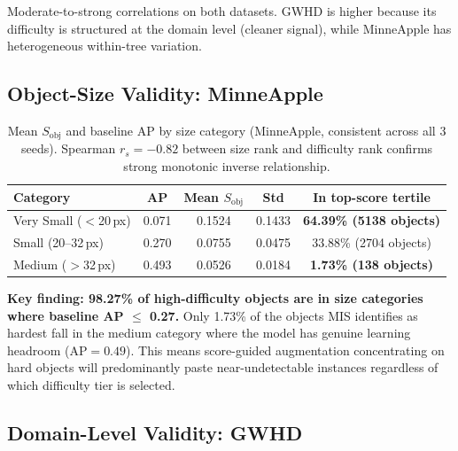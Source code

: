 \documentclass[10pt, a4paper]{article}
\begin{document}
Moderate-to-strong correlations on both datasets.
GWHD is higher because its difficulty is structured at the domain level
(cleaner signal), while MinneApple has heterogeneous within-tree variation.

\subsection{Object-Size Validity: MinneApple}

\begin{table}[H]
\centering
\small
\caption{Mean $S_{\text{obj}}$ and baseline AP by size category (MinneApple,
  consistent across all 3 seeds). Spearman $r_s=-0.82$ between size rank
  and difficulty rank confirms strong monotonic inverse relationship.}
\begin{tabular}{lcccc}
\toprule
\textbf{Category} & \textbf{AP} & \textbf{Mean $S_{\text{obj}}$}
  & \textbf{Std} & \textbf{In top-score tertile} \\
\midrule
Very Small ($<$20\,px) & 0.071 & 0.1524 & 0.1433
  & \textbf{64.39\% (5138 objects)} \\
Small (20--32\,px)     & 0.270 & 0.0755 & 0.0475
  & 33.88\% (2704 objects) \\
Medium ($>$32\,px)     & 0.493 & 0.0526 & 0.0184
  & \textbf{1.73\% (138 objects)} \\
\bottomrule
\end{tabular}
\end{table}

\textbf{Key finding: 98.27\% of high-difficulty objects are in size
categories where baseline AP $\leq$ 0.27.}
Only 1.73\% of the objects MIS identifies as hardest fall in the medium
category where the model has genuine learning headroom (AP$=0.49$).
This means score-guided augmentation concentrating on hard objects
will predominantly paste near-undetectable instances regardless of
which difficulty tier is selected.

\subsection{Domain-Level Validity: GWHD}
\end{document}
